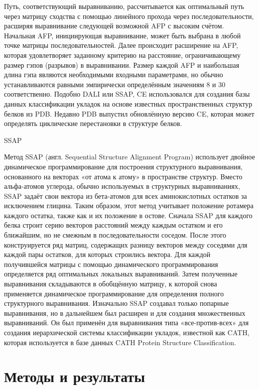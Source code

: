 \documentclass[a4paper]{extreport}
\begin{document}
Путь, соответствующий выравниванию, рассчитывается как оптимальный путь через матрицу сходства с помощью линейного прохода через последовательности, расширяя выравнивание следующей возможной AFP с высоким счётом. Начальная AFP, инициирующая выравнивание, может быть выбрана в любой точке матрицы последовательностей. Далее происходит расширение на AFP, которая удовлетворяет заданному критерию на расстояние, ограничивающему размер гэпов (разрывов) в выравнивании. Размер каждой AFP и наибольшая длина гэпа являются необходимыми входными параметрами, но обычно устанавливаются равными эмпирически определённым значениям 8 и 30 соответственно. Подобно DALI или SSAP, CE использовался для создания базы данных классификации укладок на основе известных пространственных структур белков из PDB. Недавно PDB выпустил обновлённую версию CE, которая может определять циклические перестановки в структуре белков.

SSAP

Метод SSAP (англ. Sequential Structure Alignment Program) использует двойное динамическое программирование для построения структурного выравнивания, основанного на векторах «от атома к атому» в пространстве структур. Вместо альфа-атомов углерода, обычно используемых в структурных выравниваниях, SSAP задаёт свои вектора из бета-атомов для всех аминокислотных остатков за исключением глицина. Таким образом, этот метод учитывает положение ротамера каждого остатка, также как и их положение в остове. Сначала SSAP для каждого белка строит серию векторов расстояний между каждым остатком и его ближайшим, но не смежным в последовательности соседом. После этого конструируется ряд матриц, содержащих разницу векторов между соседями для каждой пары остатков, для которых строились вектора. Для каждой получившейся матрицы с помощью динамического программирования определяется ряд оптимальных локальных выравниваний. Затем полученные выравнивания складываются в обобщённую матрицу, к которой снова применяется динамическое программирование для определения полного структурного выравнивания. Изначально SSAP создавал только попарные выравнивания, но в дальнейшем был расширен и для создания множественных выравниваний. Он был применён для выравнивания типа «все-против-всех» для создания иерархической системы классификации укладок, известной как CATH, которая используется в базе данных CATH Protein Structure Classification. 

\chapter{ Методы и результаты }
\end{document}
